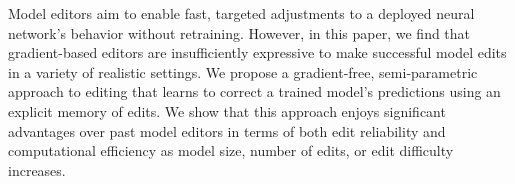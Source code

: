 Model editors aim to enable fast, targeted adjustments to a deployed neural network’s behavior without retraining. However, in this paper, we find that gradient-based editors are insufficiently expressive to make successful model edits in a variety of realistic settings. We propose a gradient-free, semi-parametric approach to editing that learns to correct a trained model’s predictions using an explicit memory of edits. We show that this approach enjoys significant advantages over past model editors in terms of both edit reliability and computational efficiency as model size, number of edits, or edit difficulty increases.
